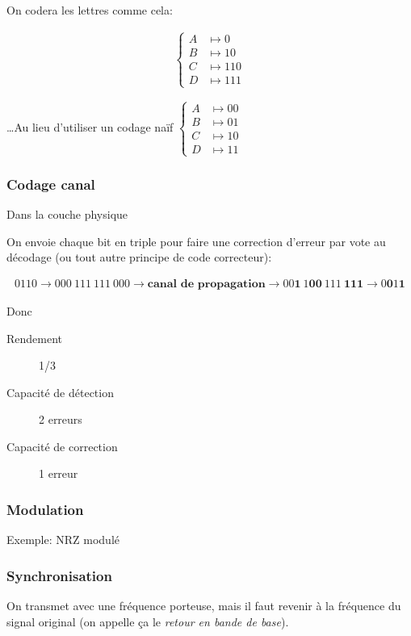 \documentclass{article}
\begin{document}
On codera les lettres comme cela:

\begin{align*}
	\begin{cases}
	A &\mapsto 0 \\
	B &\mapsto 10 \\
	C &\mapsto 110 \\
	D &\mapsto 111
	\end{cases}
\end{align*}

\ldots Au lieu d'utiliser un codage naïf $\begin{cases}
	A &\mapsto 00 \\
	B &\mapsto 01 \\
	C &\mapsto 10 \\
	D &\mapsto 11
\end{cases}$

\subsubsection{Codage canal}
Dans la couche physique

On envoie chaque bit en triple pour faire une correction d'erreur par vote au décodage (ou tout autre principe de code correcteur):

\begin{align*}
	0110 \to 000\ 111\ 111\ 000 \to \textbf{canal de propagation} \to 00{\mathbf 1}\ 1\mathbf{00}\ 111\ \mathbf{111} \to 0\mathbf{0}1\mathbf{1}
\end{align*}

Donc 
\begin{description}
	\item[Rendement] 1/3
	\item[Capacité de détection] 2 erreurs
	\item[Capacité de correction] 1 erreur
\end{description}

\subsubsection{Modulation}

Exemple: NRZ modulé

\subsubsection{Synchronisation}

On transmet avec une fréquence porteuse, mais il faut revenir à la fréquence du signal original (on appelle ça le \emph{retour en bande de base}).
\end{document}
